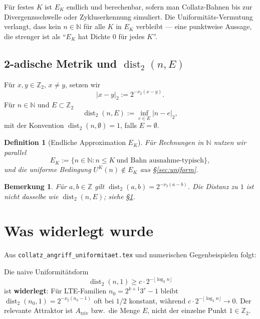 \documentclass[12pt,a4paper]{article}
\newtheorem{definition}[satz]{Definition}
\newtheorem{bemerkung}[satz]{Bemerkung}
\newcommand{\vii}{\nu_2}
\newcommand{\N}{\mathbb{N}}
\newcommand{\Z}{\mathbb{Z}}
\newcommand{\Ztwo}{\mathbb{Z}_2}
\newcommand{\disttwo}{\operatorname{dist}_2}
\begin{document}
Für festes $K$ ist $E_K$ endlich und berechenbar, sofern man Collatz-Bahnen
bis zur Divergenzsschwelle oder Zykluserkennung simuliert.
Die Uniformitäts-Vermutung verlangt, dass kein $n\in\N$ für alle $K$
in $E_K$ verbleibt --- eine punktweise Aussage, die strenger ist als
``$E_K$ hat Dichte $0$ für jedes $K$''.


\subsection{2-adische Metrik und $\disttwo(n,E)$}

F\"ur $x,y\in\Ztwo$, $x\neq y$, setzen wir
\[
  |x-y|_2 := 2^{-\vii(x-y)} .
\]
F\"ur $n\in\N$ und $E\subset\Ztwo$
\[
  \disttwo(n,E):=\inf_{e\in E}|n-e|_2 ,
\]
mit der Konvention $\disttwo(n,\emptyset)=1$, falls $E=\emptyset$.

\begin{definition}[Endliche Approximation $E_K$]
F\"ur Rechnungen in $\N$ nutzen wir parallel
\[
  E_K:=\{n\in\N : n\leq K\ \text{und Bahn ausnahme-typisch}\},
\]
und die uniforme Bedingung $U^K(n)\notin E_K$ aus \S\ref{sec:uniform}.
\end{definition}

\begin{bemerkung}
F\"ur $a,b\in\Z$ gilt $\disttwo(a,b)=2^{-\vii(a-b)}$.
Die Distanz zu $1$ ist \emph{nicht} dasselbe wie $\disttwo(n,E)$; siehe \S\ref{sec:widerlegt}.
\end{bemerkung}

\section{Was widerlegt wurde}
\label{sec:widerlegt}

Aus \texttt{collatz\_angriff\_uniformitaet.tex} und numerischen
Gegenbeispielen folgt:

\begin{tcolorbox}[bewiesen,title={Falscher Attraktor: Abstand zu $1$}]
Die naive Uniformit\"atsform
\[
  \disttwo(n,1)\geq c\cdot 2^{-\lfloor\log_2 n\rfloor}
\]
ist \textbf{widerlegt}: F\"ur LTE-Familien $n_0=2^{k+1}3^r-1$ bleibt
$\disttwo(n_0,1)=2^{-\vii(n_0-1)}$ oft bei $1/2$ konstant, w\"ahrend
$c\cdot 2^{-\lfloor\log_2 n\rfloor}\to 0$.
Der relevante Attraktor ist $A_{\mathrm{triv}}$ bzw.\ die Menge $E$,
nicht der einzelne Punkt $1\in\Ztwo$.
\end{tcolorbox}
\end{document}
